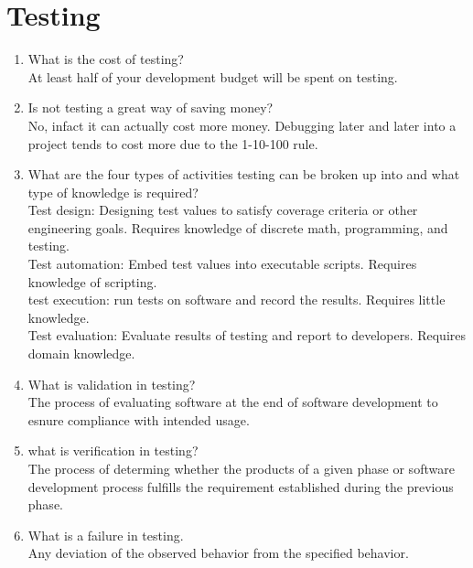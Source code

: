 \documentclass[10pt]{article}
\begin{document}
\section{Testing}

\begin{enumerate}
      \item What is the cost of testing?\\
            At least half of your development budget will be spent on testing.\\

      \item Is not testing a great way of saving money?\\
            No, infact it can actually cost more money. Debugging later and later into a project tends to cost more due to the 1-10-100 rule.\\

      \item What are the four types of activities testing can be broken up into and what type of knowledge is required?\\
            Test design: Designing test values to satisfy coverage criteria or other engineering goals. Requires knowledge of discrete math, programming, and testing.\\
            Test automation: Embed test values into executable scripts. Requires knowledge of scripting.\\
            test execution: run tests on software and record the results. Requires little knowledge.\\
            Test evaluation: Evaluate results of testing and report to developers. Requires domain knowledge.\\

      \item What is validation in testing?\\
            The process of evaluating software at the end of software development to esnure compliance with intended usage.\\

      \item what is verification in testing?\\
            The process of determing whether the products of a given phase or software development process fulfills the requirement established during the previous phase.\\

      \item What is a failure in testing.\\
            Any deviation  of the observed behavior from the specified behavior.\\


\end{enumerate}
\end{document}
